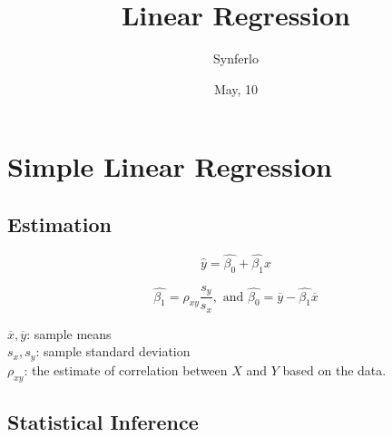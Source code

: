 \documentclass[12pt]{article}
\title{Linear Regression}
\author{Synferlo}
\date{May, 10}
\begin{document}
\maketitle
\newpage



\section{Simple Linear Regression}

\subsection{Estimation}

\begin{equation*}
 \widehat{y} =  \widehat{\beta_0} +  \widehat{\beta_1} x
\end{equation*}

\begin{equation*}
 \widehat{\beta_1} = \rho_{xy} \frac{s_{y}}{s_{x}},
 \text{ and }  \widehat{\beta_0} =  \overline{y} -  \widehat{\beta_1}
   \overline{x}
\end{equation*}

$  \overline{x},  \overline{y} $: sample means\\
$ s_{x}, s_{y} $: sample standard deviation\\
$ \rho_{xy} $: the estimate of correlation between $ X $ and $ Y $
based on the data.\\



\subsection{Statistical Inference}
\end{document}
